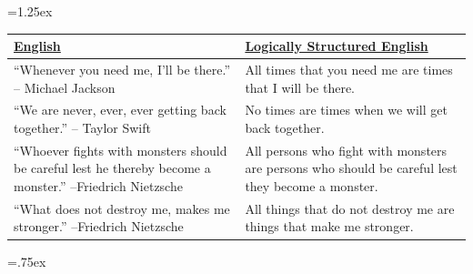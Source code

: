 \tabulinesep=1.25ex
\begin{longtabu}{p{.5\linewidth}p{.5\linewidth}}
\underline{English} &
\underline{Logically Structured English} \\
\endhead 
``Whenever you need me, I'll be there.'' -- Michael Jackson &
All times that you need me are times that I will be there. \\

``We are never, ever, ever getting back together.'' -- Taylor Swift &
No times are times when we will get back together.\\

``Whoever fights with monsters should be careful lest he thereby become a monster.'' --Friedrich Nietzsche & 
All persons who fight with monsters are persons who should be careful lest they become a monster.\\

``What does not destroy me, makes me stronger.'' --Friedrich Nietzsche & 
All things that do not destroy me are things that make me stronger. 
 

\end{longtabu}
\tabulinesep=.75ex

%
%
%
%
%
%
%


